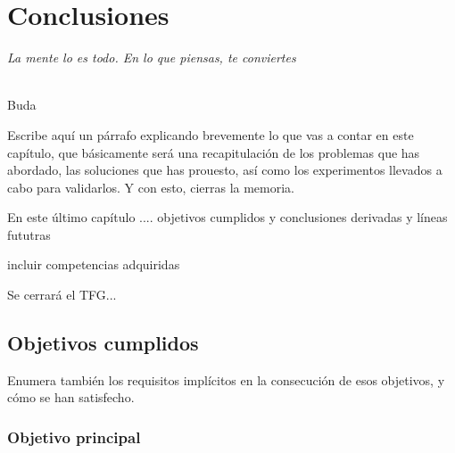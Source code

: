 \chapter{Conclusiones}
\label{cap:capitulo8}

\begin{flushright}
\begin{minipage}[]{10cm}
\emph{La mente lo es todo. En lo que piensas, te conviertes}\\
\end{minipage}\\

Buda\\
\end{flushright}

\vspace{1cm}

Escribe aquí un párrafo explicando brevemente lo que vas a contar en este capítulo, que básicamente será una recapitulación de los problemas que has abordado, las soluciones que has prouesto, así como los experimentos llevados a cabo para validarlos. Y con esto, cierras la memoria.

En este último capítulo .... objetivos cumplidos y conclusiones derivadas y líneas fututras 

incluir competencias adquiridas 

Se cerrará el TFG...

\section{Objetivos cumplidos}

Enumera también los requisitos implícitos en la consecución de esos objetivos, y cómo se han satisfecho.\\

\subsection{Objetivo principal}





